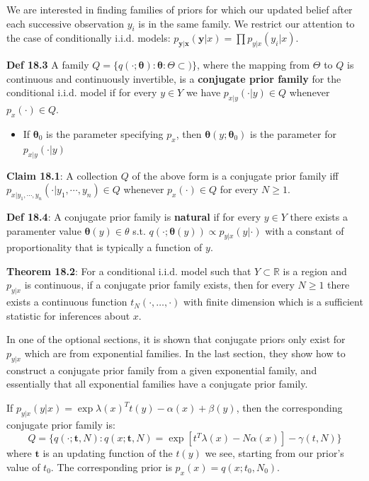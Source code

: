 \documentclass[12pt]{article} %
\begin{document}
We are interested in finding families of priors for which our updated belief after each successive observation $y_i$ is in the same family. We restrict our attention to the case of conditionally i.i.d. models: $p_{\mathbf{y|x}}(\mathbf{y}|x) = \prod p_{y|x}(y_i | x)$.

\textbf{Def 18.3} A family $Q = \{q(\cdot;\mathbf{\theta}) : \mathbf{\theta}: \Theta \subset)\}$, where the mapping from $\Theta$ to $Q$ is continuous and continuously invertible, is a \textbf{conjugate prior family} for the conditional i.i.d. model if for every $y \in Y$ we have $p_{x|y}(\cdot | y) \in Q$ whenever $p_x(\cdot) \in Q$.
\begin{itemize}[topsep=-1pt, itemsep=-1pt]
    \item If $\mathbf{\theta}_0$ is the parameter specifying $p_x$, then $\mathbf{\theta}(y;\mathbf{\theta}_0)$ is the parameter for $p_{x|y}(\cdot | y)$
\end{itemize}

\textbf{Claim 18.1}: A collection $Q$ of the above form is a conjugate prior family iff $p_{x|y_1,\cdots, y_n}(\cdot | y_1, \cdots, y_n) \in Q$ whenever $p_x(\cdot) \in Q$ for every $N \geq 1$.

\textbf{Def 18.4}: A conjugate prior family is \textbf{natural} if for every $y \in Y$ there exists a paramenter value $\mathbf{\theta}(y) \in \theta$ s.t. $q(\cdot; \mathbf{\theta}(y)) \propto p_{y|x}(y| \cdot)$ with a constant of proportionality that is typically a function of $y$.


\textbf{Theorem 18.2}: For a conditional i.i.d. model such that $Y \subset \mathbb{R}$ is a region and $p_{y|x}$ is continuous, if a conjugate prior family exists, then for every $N \geq 1$ there exists a continuous function $t_N(\cdot, \dots, \cdot)$ with finite dimension which is a sufficient statistic for inferences about $x$.

\separate

In one of the optional sections, it is shown that conjugate priors only exist for $p_{y|x}$ which are from exponential families. In the last section, they show how to construct a conjugate prior family from a given exponential family, and essentially that all exponential families have a conjugate prior family.

If $p_{y|x}(y|x) = \exp{\lambda(x)^T t(y) - \alpha(x) + \beta(y)}$, then the corresponding conjugate prior family is:
\begin{equation*}
    Q = \{ 
    q(\cdot; \mathbf{t},N):
    q(x; \mathbf{t},N)
    =
    \exp{[t^T \lambda(x) - N\alpha(x)] - \gamma(t,N)}
    \}
\end{equation*}
where $\mathbf{t}$ is an updating function of the $t(y)$ we see, starting from our prior's value of $t_0$. The corresponding prior is $p_x(x) = q(x;t_0,N_0)$.
\end{document}

